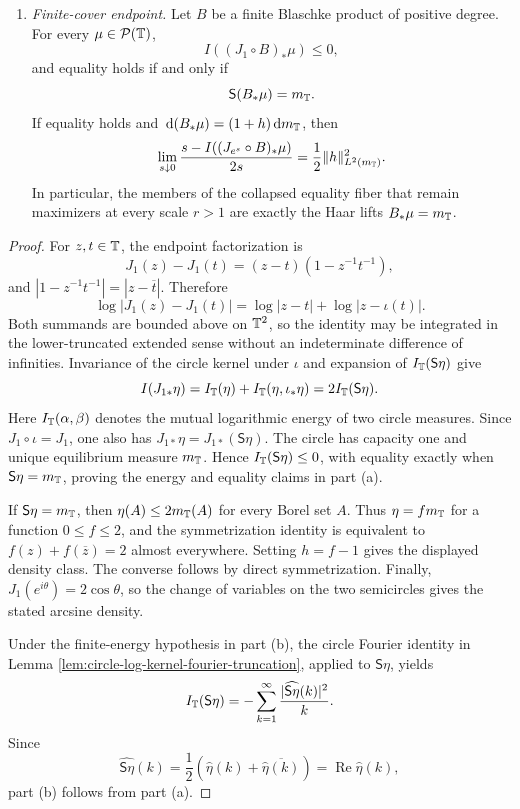 \begin{theorem}
\begin{enumerate}[label=\textup{(\alph*)},leftmargin=*]
\item \emph{Finite-cover endpoint.}  Let \(B\) be a finite Blaschke
product of positive degree.  For every \(\mu\in\mathcal P(\mathbb{T})\),
\[
I((J_1\circ B)_\ast\mu)\le0,
\]
and equality holds if and only if
\[
\mathsf S(B_\ast\mu)=m_{\mathbb{T}}.
\]
If equality holds and
\(\,\mathrm{d}(B_\ast\mu)=(1+h)\,\mathrm{d} m_{\mathbb{T}}\), then
\[
\lim_{s\downarrow0}
\frac{s-I((J_{e^s}\circ B)_\ast\mu)}{2s}
=\frac12\|h\|_{L^2(m_{\mathbb{T}})}^2.
\]
In particular, the members of the collapsed equality fiber that remain
maximizers at every scale \(r>1\) are exactly the Haar lifts
\(B_\ast\mu=m_{\mathbb{T}}\).
\end{enumerate}
\end{theorem}

\begin{proof}
For \(z,t\in\mathbb{T}\), the endpoint factorization is
\[
J_1(z)-J_1(t)=(z-t)(1-z^{-1}t^{-1}),
\]
and \(|1-z^{-1}t^{-1}|=|z-\overline t|\).  Therefore
\[
\log|J_1(z)-J_1(t)|
=\log|z-t|+\log|z-\iota(t)|.
\]
Both summands are bounded above on \(\mathbb{T}^2\), so the identity may be
integrated in the lower-truncated extended sense without an
indeterminate difference of infinities.  Invariance of the circle
kernel under \(\iota\) and expansion of
\(I_{\mathbb{T}}(\mathsf S\eta)\) give
\[
I(J_{1\ast}\eta)
=I_{\mathbb{T}}(\eta)+I_{\mathbb{T}}(\eta,\iota_\ast\eta)
=2I_{\mathbb{T}}(\mathsf S\eta).
\]
Here \(I_{\mathbb{T}}(\alpha,\beta)\) denotes the mutual logarithmic energy
of two circle measures.  Since \(J_1\circ\iota=J_1\), one also has
\(J_{1\ast}\eta=J_{1\ast}(\mathsf S\eta)\).
The circle has capacity one and unique equilibrium measure
\(m_{\mathbb{T}}\).  Hence \(I_{\mathbb{T}}(\mathsf S\eta)\le0\), with equality
exactly when \(\mathsf S\eta=m_{\mathbb{T}}\), proving the energy and equality
claims in part \textup{(a)}.

If \(\mathsf S\eta=m_{\mathbb{T}}\), then
\(\eta(A)\le2m_{\mathbb{T}}(A)\) for every Borel set \(A\).  Thus
\(\eta=fm_{\mathbb{T}}\) for a function \(0\le f\le2\), and the
symmetrization identity is equivalent to
\(f(z)+f(\overline z)=2\) almost everywhere.  Setting \(h=f-1\) gives
the displayed density class.  The converse follows by direct
symmetrization.  Finally, \(J_1(e^{i\theta})=2\cos\theta\), so the
change of variables on the two semicircles gives the stated arcsine
density.

Under the finite-energy hypothesis in part \textup{(b)}, the circle
Fourier identity in Lemma
\ref{lem:circle-log-kernel-fourier-truncation}, applied to
\(\mathsf S\eta\), yields
\[
I_{\mathbb{T}}(\mathsf S\eta)
=-\sum_{k=1}^{\infty}
\frac{|\widehat{\mathsf S\eta}(k)|^2}{k}.
\]
Since
\[
\widehat{\mathsf S\eta}(k)
=\frac12\left(\widehat\eta(k)+\overline{\widehat\eta(k)}\right)
=\operatorname{Re}\widehat\eta(k),
\]
part \textup{(b)} follows from part \textup{(a)}.


\end{proof}
